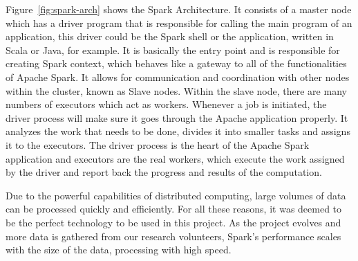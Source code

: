 Figure~\ref{fig:spark-arch} shows the Spark Architecture. It consists of a master node which has a driver program that is responsible for calling the main program of an application, this driver could be the Spark shell or the application, written in Scala or Java, for example. It is basically the entry point and is responsible for creating Spark context, which behaves like a gateway to all of the functionalities of Apache Spark. It allows for communication and coordination with other nodes within the cluster, known as Slave nodes. Within the slave node, there are many numbers of executors which act as workers. Whenever a job is initiated, the driver process will make sure it goes through the Apache application properly. It analyzes the work that needs to be done, divides it into smaller tasks and assigns it to the executors. The driver process is the heart of the Apache Spark application and executors are the real workers, which execute the work assigned by the driver and report back the progress and results of the computation.\cite{8988541}

Due to the powerful capabilities of distributed computing, large volumes of data can be processed quickly and efficiently. For all these reasons, it was deemed to be the perfect technology to be used in this project. As the project evolves and more data is gathered from our research volunteers, Spark's performance scales with the size of the data, processing with high speed.
